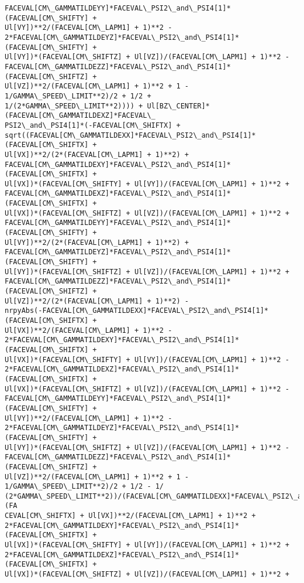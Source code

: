 \documentclass[landscape,letterpaper,10pt,english]{article}
\begin{document}
\begin{Verbatim}[commandchars=\\\{\}]
FACEVAL[CM\_GAMMATILDEYY]*FACEVAL\_PSI2\_and\_PSI4[1]*(FACEVAL[CM\_SHIFTY] +
Ul[VY])**2/(FACEVAL[CM\_LAPM1] + 1)**2 -
2*FACEVAL[CM\_GAMMATILDEYZ]*FACEVAL\_PSI2\_and\_PSI4[1]*(FACEVAL[CM\_SHIFTY] +
Ul[VY])*(FACEVAL[CM\_SHIFTZ] + Ul[VZ])/(FACEVAL[CM\_LAPM1] + 1)**2 -
FACEVAL[CM\_GAMMATILDEZZ]*FACEVAL\_PSI2\_and\_PSI4[1]*(FACEVAL[CM\_SHIFTZ] +
Ul[VZ])**2/(FACEVAL[CM\_LAPM1] + 1)**2 + 1 - 1/GAMMA\_SPEED\_LIMIT**2)/2 + 1/2 +
1/(2*GAMMA\_SPEED\_LIMIT**2)))) + Ul[BZ\_CENTER]*(FACEVAL[CM\_GAMMATILDEXZ]*FACEVAL\_
PSI2\_and\_PSI4[1]*(-FACEVAL[CM\_SHIFTX] +
sqrt((FACEVAL[CM\_GAMMATILDEXX]*FACEVAL\_PSI2\_and\_PSI4[1]*(FACEVAL[CM\_SHIFTX] +
Ul[VX])**2/(2*(FACEVAL[CM\_LAPM1] + 1)**2) +
FACEVAL[CM\_GAMMATILDEXY]*FACEVAL\_PSI2\_and\_PSI4[1]*(FACEVAL[CM\_SHIFTX] +
Ul[VX])*(FACEVAL[CM\_SHIFTY] + Ul[VY])/(FACEVAL[CM\_LAPM1] + 1)**2 +
FACEVAL[CM\_GAMMATILDEXZ]*FACEVAL\_PSI2\_and\_PSI4[1]*(FACEVAL[CM\_SHIFTX] +
Ul[VX])*(FACEVAL[CM\_SHIFTZ] + Ul[VZ])/(FACEVAL[CM\_LAPM1] + 1)**2 +
FACEVAL[CM\_GAMMATILDEYY]*FACEVAL\_PSI2\_and\_PSI4[1]*(FACEVAL[CM\_SHIFTY] +
Ul[VY])**2/(2*(FACEVAL[CM\_LAPM1] + 1)**2) +
FACEVAL[CM\_GAMMATILDEYZ]*FACEVAL\_PSI2\_and\_PSI4[1]*(FACEVAL[CM\_SHIFTY] +
Ul[VY])*(FACEVAL[CM\_SHIFTZ] + Ul[VZ])/(FACEVAL[CM\_LAPM1] + 1)**2 +
FACEVAL[CM\_GAMMATILDEZZ]*FACEVAL\_PSI2\_and\_PSI4[1]*(FACEVAL[CM\_SHIFTZ] +
Ul[VZ])**2/(2*(FACEVAL[CM\_LAPM1] + 1)**2) -
nrpyAbs(-FACEVAL[CM\_GAMMATILDEXX]*FACEVAL\_PSI2\_and\_PSI4[1]*(FACEVAL[CM\_SHIFTX] +
Ul[VX])**2/(FACEVAL[CM\_LAPM1] + 1)**2 -
2*FACEVAL[CM\_GAMMATILDEXY]*FACEVAL\_PSI2\_and\_PSI4[1]*(FACEVAL[CM\_SHIFTX] +
Ul[VX])*(FACEVAL[CM\_SHIFTY] + Ul[VY])/(FACEVAL[CM\_LAPM1] + 1)**2 -
2*FACEVAL[CM\_GAMMATILDEXZ]*FACEVAL\_PSI2\_and\_PSI4[1]*(FACEVAL[CM\_SHIFTX] +
Ul[VX])*(FACEVAL[CM\_SHIFTZ] + Ul[VZ])/(FACEVAL[CM\_LAPM1] + 1)**2 -
FACEVAL[CM\_GAMMATILDEYY]*FACEVAL\_PSI2\_and\_PSI4[1]*(FACEVAL[CM\_SHIFTY] +
Ul[VY])**2/(FACEVAL[CM\_LAPM1] + 1)**2 -
2*FACEVAL[CM\_GAMMATILDEYZ]*FACEVAL\_PSI2\_and\_PSI4[1]*(FACEVAL[CM\_SHIFTY] +
Ul[VY])*(FACEVAL[CM\_SHIFTZ] + Ul[VZ])/(FACEVAL[CM\_LAPM1] + 1)**2 -
FACEVAL[CM\_GAMMATILDEZZ]*FACEVAL\_PSI2\_and\_PSI4[1]*(FACEVAL[CM\_SHIFTZ] +
Ul[VZ])**2/(FACEVAL[CM\_LAPM1] + 1)**2 + 1 - 1/GAMMA\_SPEED\_LIMIT**2)/2 + 1/2 - 1/
(2*GAMMA\_SPEED\_LIMIT**2))/(FACEVAL[CM\_GAMMATILDEXX]*FACEVAL\_PSI2\_and\_PSI4[1]*(FA
CEVAL[CM\_SHIFTX] + Ul[VX])**2/(FACEVAL[CM\_LAPM1] + 1)**2 +
2*FACEVAL[CM\_GAMMATILDEXY]*FACEVAL\_PSI2\_and\_PSI4[1]*(FACEVAL[CM\_SHIFTX] +
Ul[VX])*(FACEVAL[CM\_SHIFTY] + Ul[VY])/(FACEVAL[CM\_LAPM1] + 1)**2 +
2*FACEVAL[CM\_GAMMATILDEXZ]*FACEVAL\_PSI2\_and\_PSI4[1]*(FACEVAL[CM\_SHIFTX] +
Ul[VX])*(FACEVAL[CM\_SHIFTZ] + Ul[VZ])/(FACEVAL[CM\_LAPM1] + 1)**2 +

\end{Verbatim}
\end{document}
